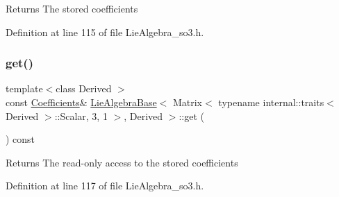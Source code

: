 \begin{DoxyReturn}{Returns}
The stored coefficients 
\end{DoxyReturn}


Definition at line 115 of file Lie\+Algebra\+\_\+so3.\+h.

\hypertarget{class_lie_algebra_base_3_01_matrix_3_01typename_01internal_1_1traits_3_01_derived_01_4_1_1_scalabfa0bdce6d9781ee940346c3f6d91f4e_aaf1d1fb3045b05a1a3ab60dbaeaf8a6b}{}\label{class_lie_algebra_base_3_01_matrix_3_01typename_01internal_1_1traits_3_01_derived_01_4_1_1_scalabfa0bdce6d9781ee940346c3f6d91f4e_aaf1d1fb3045b05a1a3ab60dbaeaf8a6b} 
\subsubsection{\texorpdfstring{get()}{get()}\hspace{0.1cm}{\footnotesize\ttfamily [2/2]}}
{\footnotesize\ttfamily template$<$class Derived $>$ \\
const \hyperlink{class_lie_algebra_base_3_01_matrix_3_01typename_01internal_1_1traits_3_01_derived_01_4_1_1_scalabfa0bdce6d9781ee940346c3f6d91f4e_a36f132794b928bcf1f707bf88d392288}{Coefficients}\& \hyperlink{class_lie_algebra_base}{Lie\+Algebra\+Base}$<$ Matrix$<$ typename internal\+::traits$<$ Derived $>$\+::Scalar, 3, 1 $>$, Derived $>$\+::get (\begin{DoxyParamCaption}{ }\end{DoxyParamCaption}) const\hspace{0.3cm}{\ttfamily [inline]}}

\begin{DoxyReturn}{Returns}
The read-\/only access to the stored coefficients 
\end{DoxyReturn}


Definition at line 117 of file Lie\+Algebra\+\_\+so3.\+h.

\hypertarget{class_lie_algebra_base_3_01_matrix_3_01typename_01internal_1_1traits_3_01_derived_01_4_1_1_scalabfa0bdce6d9781ee940346c3f6d91f4e_aa1e456962c1fc5198a19c438f6dfca4a}{}\label{class_lie_algebra_base_3_01_matrix_3_01typename_01internal_1_1traits_3_01_derived_01_4_1_1_scalabfa0bdce6d9781ee940346c3f6d91f4e_aa1e456962c1fc5198a19c438f6dfca4a} 
